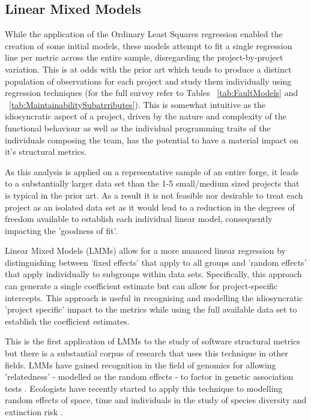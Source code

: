 \subsection{Linear Mixed Models}
While the application of the Ordinary Least Squares regression enabled the creation of some initial models, these models attempt to fit a single regression line per metric across the entire sample, disregarding the project-by-project variation. This is at odds with the prior art which tends to produce a distinct population of observations for each project and study them individually using regression techniques (for the full survey refer to Tables ~\ref{tab:FaultModels} and ~\ref{tab:MaintainabilitySubatrributes}). This is somewhat intuitive as the idiosyncratic aspect of a project, driven by the nature and complexity of the functional behaviour as well as the individual programming traits of the individuals composing the team, has the potential to have a material impact on it's structural metrics.

As this analysis is applied on a representative sample of an entire forge, it leads to a substantially larger data set than the 1-5 small/medium sized projects that is typical in the prior art. As a result it is not feasible nor desirable to treat each project as an isolated data set as it would lead to a reduction in the degrees of freedom available to establish each individual linear model, consequently impacting the 'goodness of fit'.

Linear Mixed Models (LMMs) allow for a more nuanced linear regression by distinguishing between 'fixed effects' that apply to all groups and 'random effects' that apply individually to subgroups within data sets. Specifically, this approach can generate a single coefficient estimate but can allow for project-specific intercepts. This approach is useful in recognising and modelling the idiosyncratic 'project specific' impact to the metrics while using the full available data set to establish the coefficient estimates. 

This is the first application of LMMs to the study of software structural metrics but there is a substantial corpus of research that uses this technique in other fields. LMMs have gained recognition in the field of genomics for allowing 'relatedness' - modelled as the random effects - to factor in genetic association tests \citep{zhou2012genome}. Ecologists have recently started to apply this technique to modelling random effects of space, time and individuals in the study of species diversity and extinction risk \citep{bolker2009generalized}.

